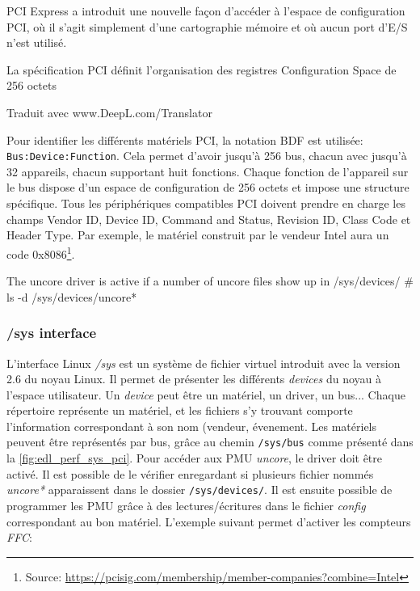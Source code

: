     

PCI Express a introduit une nouvelle façon d'accéder à l'espace de configuration PCI, où il s'agit simplement d'une cartographie mémoire et où aucun port d'E/S n'est utilisé. 

La spécification PCI définit l'organisation des registres Configuration Space de 256 octets 



Traduit avec www.DeepL.com/Translator
    
    
    Pour identifier les différents matériels PCI, la notation BDF est utilisée: \verb| Bus:Device:Function|. Cela permet d'avoir jusqu'à 256 bus, chacun avec jusqu'à 32 appareils, chacun supportant huit fonctions. Chaque fonction de l'appareil sur le bus dispose d'un espace de configuration de 256 octets et impose une structure spécifique. Tous les périphériques compatibles PCI doivent prendre en charge les champs Vendor ID, Device ID, Command and Status, Revision ID, Class Code et Header Type. Par exemple, le matériel construit par le vendeur Intel aura un code 0x8086\footnote{Source: \url{https://pcisig.com/membership/member-companies?combine=Intel}}.
    


    
    The uncore driver is active if a number of uncore files show up in /sys/devices/
    # ls -d /sys/devices/uncore*


    \subsubsection{/sys interface}
    L'interface Linux \textit{/sys} est un système de fichier virtuel introduit avec la version 2.6 du noyau Linux. Il permet de présenter les différents \textit{devices} du noyau à l'espace utilisateur. Un \textit{device} peut être un matériel, un driver, un bus... Chaque répertoire représente un matériel, et les fichiers s'y trouvant comporte l'information correspondant à son nom (vendeur, évenement. Les matériels peuvent être représentés par bus, grâce au chemin \verb|/sys/bus| comme présenté dans la \autoref{fig:edl_perf_sys_pci}. Pour accéder aux PMU \textit{uncore}, le driver doit être activé. Il est possible de le vérifier enregardant si plusieurs fichier nommés \textit{uncore*} apparaissent dans le dossier \verb|/sys/devices/|. Il est ensuite possible de programmer les PMU grâce à des lectures/écritures dans le fichier \textit{config} correspondant au bon matériel. L'exemple suivant permet d'activer les compteurs \textit{FFC}:
   

